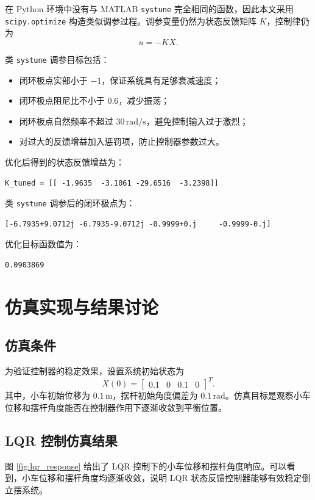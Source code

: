 \documentclass[11pt]{article}
\begin{document}
在 Python 环境中没有与 MATLAB \texttt{systune} 完全相同的函数，因此本文采用 \texttt{scipy.optimize} 构造类似调参过程。调参变量仍然为状态反馈矩阵 $K$，控制律仍为
\begin{equation}
 u=-KX.
\end{equation}

类 \texttt{systune} 调参目标包括：
\begin{itemize}
    \item 闭环极点实部小于 $-1$，保证系统具有足够衰减速度；
    \item 闭环极点阻尼比不小于 $0.6$，减少振荡；
    \item 闭环极点自然频率不超过 $30\,\mathrm{rad/s}$，避免控制输入过于激烈；
    \item 对过大的反馈增益加入惩罚项，防止控制器参数过大。
\end{itemize}

优化后得到的状态反馈增益为：
\begin{verbatim}
K_tuned = [[ -1.9635  -3.1061 -29.6516  -3.2398]]
\end{verbatim}
类 \texttt{systune} 调参后的闭环极点为：
\begin{verbatim}
[-6.7935+9.0712j -6.7935-9.0712j -0.9999+0.j     -0.9999-0.j]
\end{verbatim}
优化目标函数值为：
\begin{verbatim}
0.0903869
\end{verbatim}

\section{仿真实现与结果讨论}

\subsection{仿真条件}
为验证控制器的稳定效果，设置系统初始状态为
\begin{equation}
X(0)=
\begin{bmatrix}
0.1 & 0 & 0.1 & 0
\end{bmatrix}^T.
\end{equation}
其中，小车初始位移为 $0.1\,\mathrm{m}$，摆杆初始角度偏差为 $0.1\,\mathrm{rad}$。仿真目标是观察小车位移和摆杆角度能否在控制器作用下逐渐收敛到平衡位置。

\subsection{LQR 控制仿真结果}
图 \ref{fig:lqr_response} 给出了 LQR 控制下的小车位移和摆杆角度响应。可以看到，小车位移和摆杆角度均逐渐收敛，说明 LQR 状态反馈控制器能够有效稳定倒立摆系统。
\end{document}

